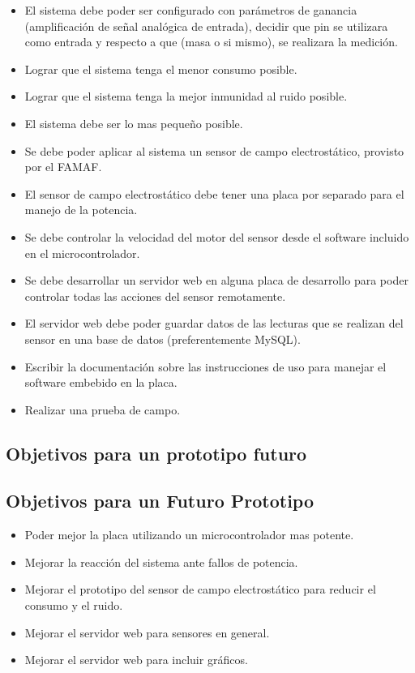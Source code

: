\begin{itemize}
    \item El sistema debe poder ser configurado con parámetros de ganancia (amplificación de señal analógica de entrada), decidir que pin se utilizara como entrada y respecto a que (masa o si mismo), se realizara la medición.
    \item Lograr que el sistema tenga el menor consumo posible.
    \item Lograr que el sistema tenga la mejor inmunidad al ruido posible.
    \item El sistema debe ser lo mas pequeño posible.
    \item Se debe poder aplicar al sistema un sensor de campo electrostático, provisto por el FAMAF.
    \item El sensor de campo electrostático debe tener una placa por separado para el manejo de la potencia.
    \item Se debe controlar la velocidad del motor del sensor desde el software incluido en el microcontrolador.
    \item Se debe desarrollar un servidor web en alguna placa de desarrollo para poder controlar todas las acciones del sensor remotamente.
    \item El servidor web debe poder guardar datos de las lecturas que se realizan del sensor en una base de datos (preferentemente MySQL).
    \item Escribir la documentación sobre las instrucciones de uso para manejar el software embebido en la placa.
    \item Realizar una prueba de campo.
\end{itemize}

\subsection{Objetivos para un prototipo futuro} %
\label{sub:objetivos_para_un_prototipo_futuro}

\subsection{Objetivos para un Futuro Prototipo} %
\label{sec: objetivos_futuros}

\begin{itemize}
    \item Poder mejor la placa utilizando un microcontrolador mas potente.
    \item Mejorar la reacción del sistema ante fallos de potencia.
    \item Mejorar el prototipo del sensor de campo electrostático para reducir el consumo y el ruido.
    \item Mejorar el servidor web para sensores en general.
    \item Mejorar el servidor web para incluir gráficos.
\end{itemize}


